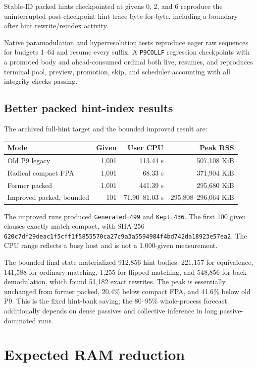 \documentclass[11pt]{article}
\newcommand{\setting}[1]{\texttt{#1}}
\begin{document}
Stable-ID packed hints checkpointed at givens 0, 2, and 6 reproduce the
uninterrupted post-checkpoint hint trace byte-for-byte, including a boundary
after hint rewrite/reindex activity.

Native paramodulation and hyperresolution tests reproduce eager raw sequences
for budgets 1--64 and resume every suffix.  A \setting{P9COLLF} regression
checkpoints with a promoted body and ahead-consumed ordinal both live, resumes,
and reproduces terminal pool, preview, promotion, skip, and scheduler
accounting with all integrity checks passing.

\subsection{Better packed hint-index results}

The archived full-hint target and the bounded improved result are:

\begin{center}
\begin{tabular}{lrrr}
\toprule
Mode & Given & User CPU & Peak RSS \\
\midrule
Old P9 legacy & 1,001 & 113.44 s & 507,108 KiB \\
Radical compact FPA & 1,001 & 68.33 s & 371,904 KiB \\
Former packed & 1,001 & 441.39 s & 295,680 KiB \\
Improved packed, bounded & 101 & 71.90--81.03 s & 295,808--296,064 KiB \\
\bottomrule
\end{tabular}
\end{center}

The improved runs produced \setting{Generated=499} and
\setting{Kept=436}.  The first 100 given clauses exactly match compact, with
SHA-256
\setting{620c7df29deac1f5cff1f5855570ca27c9a3a5594984f4bd742da18923e57ea2}.
The CPU range reflects a busy host and is not a 1,000-given measurement.

The bounded final state materialized 912,856 hint bodies: 221,157 for
equivalence, 141,588 for ordinary matching, 1,255 for flipped matching, and
548,856 for back-demodulation, which found 51,182 exact rewrites.  The peak is
essentially unchanged from former packed, 20.4\% below compact FPA, and 41.6\%
below old P9.  This is the fixed hint-bank saving; the 80--95\% whole-process
forecast additionally depends on dense passives and collective inference in
long passive-dominated runs.

\section{Expected RAM reduction}
\end{document}
